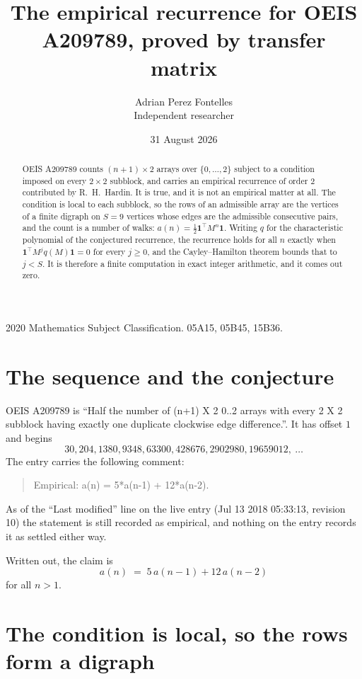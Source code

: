 \documentclass[11pt,a4paper]{article}
\title{The empirical recurrence for OEIS A209789, proved by transfer matrix}
\author{Adrian Perez Fontelles\\ \small Independent researcher}
\date{31 August 2026}
\theoremstyle{plain}
\theoremstyle{definition}
\begin{document}
\maketitle

\begin{abstract}
OEIS A209789 counts $(n+1)\times2$ arrays over $\{0,\dots,2\}$ subject to a condition imposed on
every $2\times2$ subblock, and carries an empirical recurrence of order $2$ contributed
by R.~H.~Hardin. It is true, and it is not an empirical matter at all. The condition is local
to each subblock, so the rows of an admissible array are the vertices of a finite digraph
on $S=9$ vertices whose edges are the admissible consecutive pairs, and the count is a
number of walks: $a(n)=\tfrac1{2}\mathbf{1}^{\!\top}M^{n}\mathbf{1}$. Writing $q$
for the characteristic polynomial of the conjectured recurrence, the recurrence holds for all
$n$ exactly when $\mathbf{1}^{\!\top}M^{j}q(M)\mathbf{1}=0$ for every $j\ge0$, and the
Cayley--Hamilton theorem bounds that to $j<S$. It is therefore a finite computation in exact
integer arithmetic, and it comes out zero.
\end{abstract}

\noindent\small 2020 Mathematics Subject Classification. 05A15, 05B45, 15B36.\normalsize

\section{The sequence and the conjecture}

OEIS A209789 is ``Half the number of (n+1) X 2 0..2 arrays with every 2 X 2 subblock having exactly one duplicate clockwise edge difference.''. It has offset $1$ and begins
\[
30, 204, 1380, 9348, 63300, 428676, 2902980, 19659012,\ \dots
\]
The entry carries the following comment:
\begin{quote}\small
Empirical: a(n) = 5*a(n-1) + 12*a(n-2).
\end{quote}
As of the ``Last modified'' line on the live entry (Jul 13 2018 05:33:13, revision 10) the statement is
still recorded as empirical, and nothing on the entry records it as settled either way.

Written out, the claim is
\begin{equation}\label{eq:conj}
a(n)\;=\;5\,a(n-1) + 12\,a(n-2)
\end{equation}
for all $n>1$.

\section{The condition is local, so the rows form a digraph}
\end{document}
